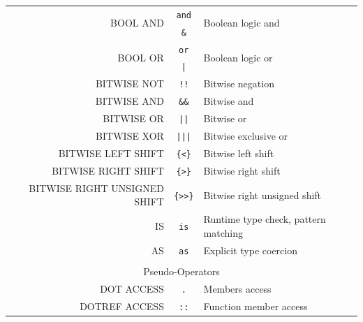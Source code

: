 \begin{table}[H]
{\begin{tabular}{rcl}
		\multirow{2}{*}{BOOL AND}       & \texttt{and}    & \multirow{2}{*}{Boolean logic and}              \\
	                                	& \texttt{\&}     &                                                 \\\hline
		\multirow{2}{*}{BOOL OR}        & \texttt{or}     & \multirow{2}{*}{Boolean logic or}               \\
	                                	& \texttt{|}      &                                                 \\\hline
		BITWISE NOT                     & \texttt{!!}     & Bitwise negation                                \\\hline
		BITWISE AND                     & \texttt{\&\&}   & Bitwise and                                     \\\hline
		BITWISE OR                      & \texttt{||}     & Bitwise or                                      \\\hline
		BITWISE XOR                     & \texttt{|||}    & Bitwise exclusive or                            \\\hline
		BITWISE LEFT SHIFT              & \texttt{\{<\}}  & Bitwise left shift                              \\\hline
		BITWISE RIGHT SHIFT             & \texttt{\{>\}}  & Bitwise right shift                             \\\hline
		BITWISE RIGHT UNSIGNED SHIFT    & \texttt{\{>>\}} & Bitwise right unsigned shift                    \\\hline
		IS                              & \texttt{is}     & Runtime type check, pattern matching            \\\hline
		AS                              & \texttt{as}     & Explicit type coercion                          \\\hline
	    \\
		\multicolumn{3}{c}{Pseudo-Operators}                                                                \\\hline
		DOT ACCESS                      & \texttt{.}      & Members access                                  \\\hline
		DOTREF ACCESS                   & \texttt{::}     & Function member access                          \\\hline
	\end{tabular}
}
\end{table}

